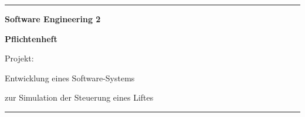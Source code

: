 

\begin{titlepage}
	\vspace*{\fill}

	\rule{\textwidth}{0.25pt}

	\vspace*{1cm}

	\begin{singlespace}
		\begin{center}	\Large	\bfseries
			Software Engineering 2
		\end{center}
	\end{singlespace}

	\vspace{1em}

	\begin{singlespace}
		\begin{center}	\Large \bfseries
		Pflichtenheft
		
		\vspace{2em}	\large
		Projekt:
		
		Entwicklung eines Software-Systems
		
		zur Simulation der Steuerung eines Liftes
		\end{center}
	\end{singlespace}

	\vspace*{5cm}

	\rule{\textwidth}{0.25pt}

	\vspace*{\fill}
\end{titlepage}


\tableofcontents




\glsaddall %
\printglossary[title=Allgemeiner Glossar, toctitle=Allgemeiner Glossar, type=allg]

\printglossary[title=Projektspezifischer Glossar, toctitle=Projektspezifischer Glossar]


